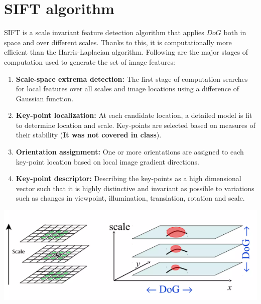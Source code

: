 \section{SIFT algorithm}
SIFT is a scale invariant feature detection algorithm that applies $DoG$ both in space and over different scales. Thanks to this, it is computationally more efficient than the Harris-Laplacian algorithm. Following are the major stages of computation used to generate the set of image features:
\begin{enumerate}
    \item \textbf{Scale-space extrema detection:} The first stage of computation searches for local features over all scales and image locations using a difference of Gaussian function.
    \item \textbf{Key-point localization:} At each candidate location, a detailed model is fit to determine location and scale. Key-points are selected based on measures of their stability (\textbf{It was not covered in class}).
    \item \textbf{Orientation assignment:} One or more orientations are assigned to each key-point location based on local image gradient directions.
    \item \textbf{Key-point descriptor:} Describing the key-points as a high dimensional vector such that it is highly distinctive and invariant as possible to variations such as changes in viewpoint, illumination, translation, rotation and scale.
\end{enumerate}
\begin{center}
    \includegraphics[]{images/DoG space scales.png}
\end{center}


